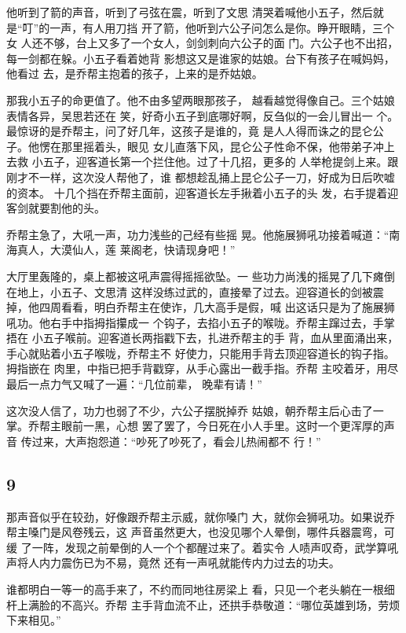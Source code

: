 他听到了箭的声音，听到了弓弦在震，听到了文思
清哭着喊他小五子，然后就是“叮”的一声，有人用刀挡
开了箭，他听到六公子问怎么是你。睁开眼睛，三个女
人还不够，台上又多了一个女人，剑剑刺向六公子的面
门。六公子也不出招，每一剑都在躲。小五子看着她背
影想这又是谁家的姑娘。台下有孩子在喊妈妈，他看过
去，是乔帮主抱着的孩子，上来的是乔姑娘。

那我小五子的命更值了。他不由多望两眼那孩子，
越看越觉得像自己。三个姑娘表情各异，吴思若还在
笑，好奇小五子到底哪好啊，反刍似的一会儿冒出一
个。最惊讶的是乔帮主，问了好几年，这孩子是谁的，竟
是人人得而诛之的昆仑公子。他愣在那里摇着头，眼见
女儿直落下风，昆仑公子性命不保，他带弟子冲上去救
小五子，迎客道长第一个拦住他。过了十几招，更多的
人举枪提剑上来。跟刚才不一样，这次没人帮他了，谁
都想趁乱捅上昆仑公子一刀，好成为日后吹嘘的资本。
十几个挡在乔帮主面前，迎客道长左手揪着小五子的头
发，右手提着迎客剑就要割他的头。

乔帮主急了，大吼一声，功力浅些的己经有些摇
晃。他施展狮吼功接着喊道：“南海真人，大漠仙人，莲
莱阁老，快请现身吧！”

大厅里轰隆的，桌上都被这吼声震得摇摇欲坠。一
些功力尚浅的摇晃了几下瘫倒在地上，小五子、文思清
这样没练过武的，直接晕了过去。迎容道长的剑被震
掉，他四周看看，明白乔帮主在使诈，几大高手是假，喊
出这话只是为了施展狮吼功。他右手中指拇指攥成一
个钩子，去掐小五子的喉咙。乔帮主蹿过去，手掌捂在
小五子喉前。迎客道长两指戳下去，扎进乔帮主的手
背，血从里面涌出来，手心就贴着小五子喉咙，乔帮主不
好使力，只能用手背去顶迎容道长的钩子指。拇指嵌在
肉里，中指已把手背戳穿，从手心露出一截手指。乔帮
主咬着牙，用尽最后一点力气又喊了一遍：“几位前辈，
晚辈有请！”

这次没人信了，功力也弱了不少，六公子摆脱掉乔
姑娘，朝乔帮主后心击了一掌。乔帮主眼前一黑，心想
罢了罢了，今日死在小人手里。这时一个更浑厚的声音
传过来，大声抱怨道：“吵死了吵死了，看会儿热闹都不
行！”
\newline

{\centering\subsection{9}}

那声音似乎在较劲，好像跟乔帮主示威，就你嗓门
大，就你会狮吼功。如果说乔帮主嗓门是风卷残云，这
声音虽然更大，也没见哪个人晕倒，哪件兵器震弯，可缓
了一阵，发现之前晕倒的人一个个都醒过来了。着实令
人啧声叹奇，武学算吼声将人内力震伤已为不易，竟然
还有一声吼就能传内力过去的功夫。

谁都明白一等一的高手来了，不约而同地往房梁上
看，只见一个老头躺在一根细杆上满脸的不高兴。乔帮
主手背血流不止，还拱手恭敬道：“哪位英雄到场，劳烦
下来相见。”


